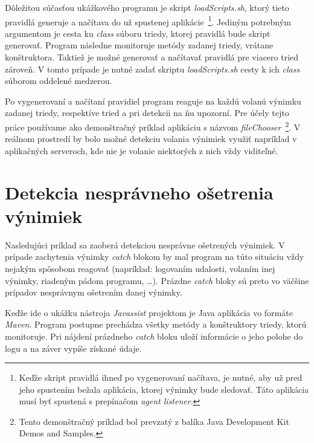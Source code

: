 \documentclass[11pt,final,oneside]{fithesis}
\begin{document}
Dôležitou súčasťou ukážkového programu je skript \textit{loadScripts.sh}, ktorý
tieto pravidlá generuje a načítava do už spustenej aplikácie~\footnote{Keďže 
skript pravidlá ihneď po vygenerovaní načítava, je nutné, aby už pred jeho 
spustením bežala aplikácia, ktorej výnimky bude sledovať. Táto aplikácia musí 
byť spustená s prepínačom \textit{agent listener}.}. Jediným 
potrebným argumentom je cesta ku \textit{class} súboru triedy, ktorej pravidlá 
bude skript generovať. Program následne monitoruje metódy zadanej triedy,
vrátane konštruktora. Taktiež je možné generovať a načítavať pravidlá
pre viacero tried zároveň. V tomto prípade je nutné zadať skriptu 
\textit{loadScripts.sh} cesty k ich \textit{class} súborom oddelené medzerou.

Po vygenerovaní a načítaní pravidiel program reaguje na každú volanú výnimku 
zadanej triedy, respektíve tried a pri detekcii na ňu upozorní. Pre účely tejto
práce používame ako demonštračný príklad aplikáciu s názvom 
\textit{fileChooser}~\footnote{Tento demonštračný príklad bol prevzatý z 
balíka Java Development Kit Demos and Samples.}. V reálnom prostredí by bolo 
možné detekciu volania výnimiek využiť napríklad v aplikačných serveroch, kde 
nie je volanie niektorých z nich vždy viditeľné.

\section{Detekcia nesprávneho ošetrenia výnimiek}
Nasledujúci príklad sa zaoberá detekciou nesprávne ošetrených výnimiek. V 
prípade zachytenia výnimky \textit{catch} blokom by mal program na túto 
situáciu vždy 
nejakým spôsobom reagovať (napríklad: logovaním udalosti, volaním inej výnimky,
riadeným pádom programu, …). Prázdne \textit{catch} bloky sú preto vo väčšine 
prípadov nesprávnym ošetrením danej výnimky.

Keďže ide o ukážku nástroja
\textit{Javassist} projektom je Java aplikácia vo formáte \textit{Maven}. 
Program postupne prechádza všetky metódy a konštruktory triedy, ktorú
monitoruje. Pri nájdení prázdneho \textit{catch} bloku uloží informácie o jeho
polohe do logu a na záver vypíše získané údaje.
\end{document}
